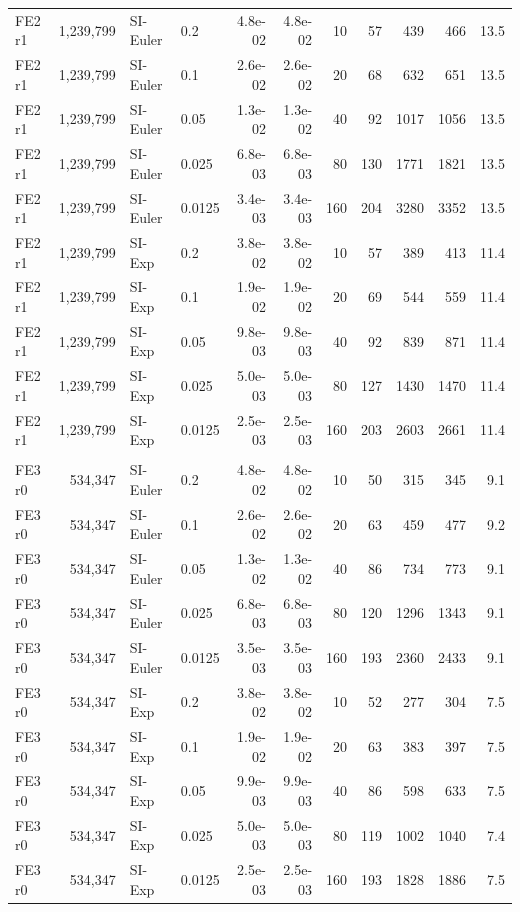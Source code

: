 \begin{longtable}{>{\footnotesize}l>{\footnotesize}r>{\footnotesize}l>{\footnotesize}l>{\footnotesize}r>{\footnotesize}r>{\footnotesize}r>{\footnotesize}r>{\footnotesize}r>{\footnotesize}r>{\footnotesize}r}
FE2 r1 & 1,239,799 & SI-Euler & 0.2 & 4.8e-02 & 4.8e-02 & 10 & 57 & 439 & 466 & 13.5 \\
FE2 r1 & 1,239,799 & SI-Euler & 0.1 & 2.6e-02 & 2.6e-02 & 20 & 68 & 632 & 651 & 13.5 \\
FE2 r1 & 1,239,799 & SI-Euler & 0.05 & 1.3e-02 & 1.3e-02 & 40 & 92 & 1017 & 1056 & 13.5 \\
FE2 r1 & 1,239,799 & SI-Euler & 0.025 & 6.8e-03 & 6.8e-03 & 80 & 130 & 1771 & 1821 & 13.5 \\
FE2 r1 & 1,239,799 & SI-Euler & 0.0125 & 3.4e-03 & 3.4e-03 & 160 & 204 & 3280 & 3352 & 13.5 \\
FE2 r1 & 1,239,799 & SI-Exp & 0.2 & 3.8e-02 & 3.8e-02 & 10 & 57 & 389 & 413 & 11.4 \\
FE2 r1 & 1,239,799 & SI-Exp & 0.1 & 1.9e-02 & 1.9e-02 & 20 & 69 & 544 & 559 & 11.4 \\
FE2 r1 & 1,239,799 & SI-Exp & 0.05 & 9.8e-03 & 9.8e-03 & 40 & 92 & 839 & 871 & 11.4 \\
FE2 r1 & 1,239,799 & SI-Exp & 0.025 & 5.0e-03 & 5.0e-03 & 80 & 127 & 1430 & 1470 & 11.4 \\
FE2 r1 & 1,239,799 & SI-Exp & 0.0125 & 2.5e-03 & 2.5e-03 & 160 & 203 & 2603 & 2661 & 11.4 \\
\noalign{\smallskip}
\multicolumn{11}{l}{\textbf{FEMFFUSION FE3}} \\
FE3 r0 & 534,347 & SI-Euler & 0.2 & 4.8e-02 & 4.8e-02 & 10 & 50 & 315 & 345 & 9.1 \\
FE3 r0 & 534,347 & SI-Euler & 0.1 & 2.6e-02 & 2.6e-02 & 20 & 63 & 459 & 477 & 9.2 \\
FE3 r0 & 534,347 & SI-Euler & 0.05 & 1.3e-02 & 1.3e-02 & 40 & 86 & 734 & 773 & 9.1 \\
FE3 r0 & 534,347 & SI-Euler & 0.025 & 6.8e-03 & 6.8e-03 & 80 & 120 & 1296 & 1343 & 9.1 \\
FE3 r0 & 534,347 & SI-Euler & 0.0125 & 3.5e-03 & 3.5e-03 & 160 & 193 & 2360 & 2433 & 9.1 \\
FE3 r0 & 534,347 & SI-Exp & 0.2 & 3.8e-02 & 3.8e-02 & 10 & 52 & 277 & 304 & 7.5 \\
FE3 r0 & 534,347 & SI-Exp & 0.1 & 1.9e-02 & 1.9e-02 & 20 & 63 & 383 & 397 & 7.5 \\
FE3 r0 & 534,347 & SI-Exp & 0.05 & 9.9e-03 & 9.9e-03 & 40 & 86 & 598 & 633 & 7.5 \\
FE3 r0 & 534,347 & SI-Exp & 0.025 & 5.0e-03 & 5.0e-03 & 80 & 119 & 1002 & 1040 & 7.4 \\
FE3 r0 & 534,347 & SI-Exp & 0.0125 & 2.5e-03 & 2.5e-03 & 160 & 193 & 1828 & 1886 & 7.5 \\

\end{longtable}
